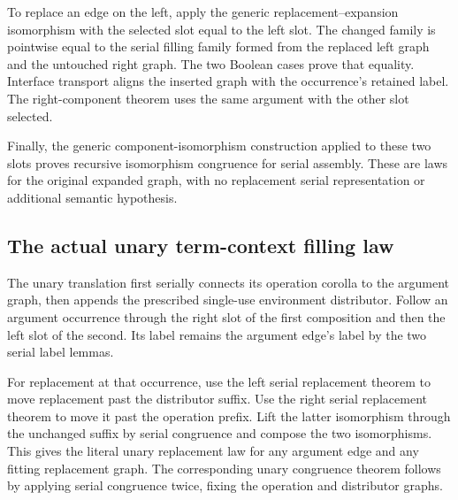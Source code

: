 

To replace an edge on the left, apply the generic replacement--expansion
isomorphism with the selected slot equal to the left slot. The changed
family is pointwise equal to the serial filling family formed from the
replaced left graph and the untouched right graph. The two Boolean cases
prove that equality. Interface transport aligns the inserted graph with
the occurrence's retained label. The right-component theorem uses the
same argument with the other slot selected.

Finally, the generic component-isomorphism construction applied to these
two slots proves recursive isomorphism congruence for serial assembly.
These are laws for the original expanded graph, with no replacement serial
representation or additional semantic hypothesis.







\subsection{The actual unary term-context filling law}


The unary translation first serially connects its operation corolla to the
argument graph, then appends the prescribed single-use environment
distributor. Follow an argument occurrence through the right slot of the
first composition and then the left slot of the second. Its label remains
the argument edge's label by the two serial label lemmas.

For replacement at that occurrence, use the left serial replacement theorem
to move replacement past the distributor suffix. Use the right serial
replacement theorem to move it past the operation prefix. Lift the latter
isomorphism through the unchanged suffix by serial congruence and compose
the two isomorphisms. This gives the literal unary replacement law for any
argument edge and any fitting replacement graph. The corresponding unary
congruence theorem follows by applying serial congruence twice, fixing the
operation and distributor graphs.





